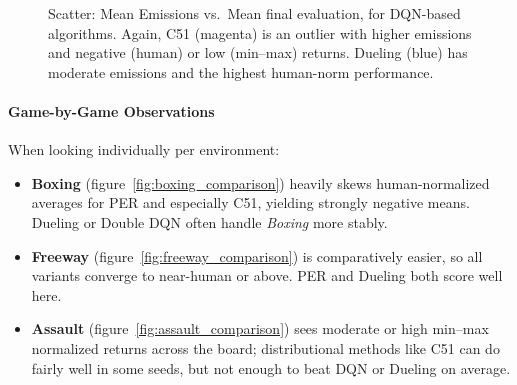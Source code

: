 \begin{figure}
	\centering
	\quad
	\caption{Scatter: Mean Emissions vs.\ Mean final evaluation, for DQN-based algorithms. 
		Again, C51 (magenta) is an outlier with higher emissions and negative (human) or low (min--max) returns. 
		Dueling (blue) has moderate emissions and the highest human-norm performance.}
	\label{fig:dqn_scatter_mean_mean}
\end{figure}

\paragraph{Game-by-Game Observations}
When looking individually per environment:
\begin{itemize}
	\item \textbf{Boxing} (figure~\ref{fig:boxing_comparison}) heavily skews human-normalized averages for PER and especially C51, 
	yielding strongly negative means. 
	Dueling or Double DQN often handle \emph{Boxing} more stably.
	\item \textbf{Freeway} (figure~\ref{fig:freeway_comparison}) is comparatively easier, so all variants converge to near-human or above. 
	PER and Dueling both score well here. 
	\item \textbf{Assault} (figure~\vref{fig:assault_comparison}) sees moderate or high min--max normalized returns across the board; 
	distributional methods like C51 can do fairly well in some seeds, but not enough to beat DQN or Dueling on average.
\end{itemize}

